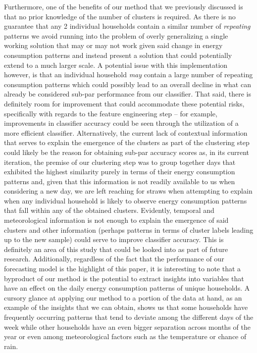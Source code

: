 \noindent \newline Furthermore, one of the benefits of our method that we previously discussed is that no prior knowledge of the number of clusters is required. As there is no guarantee that any 2 individual households contain a similar number of \textit{repeating} patterns we avoid running into the problem of overly generalizing a single working solution that may or may not work given said change in energy consumption patterns and instead present a solution that could potentially extend to a much larger scale. A potential issue with this implementation however, is that an individual household \textit{may} contain a large number of repeating consumption patterns which could possibly lead to an overall decline in what can already be considered sub-par performance from our classifier. That said, there is definitely room for improvement that could accommodate these potential risks, specifically with regards to the feature engineering step -- for example, improvements in classifier accuracy could be seen through the utilization of a more efficient classifier. Alternatively, the current lack of contextual information that serves to explain the emergence of the clusters as part of the clustering step could likely be the reason for obtaining sub-par accuracy scores as, in its current iteration, the premise of our clustering step was to group together days that exhibited the highest similarity purely in terms of their energy consumption patterns and, given that this information is not readily available to us when considering a new day, we are left reaching for straws when attempting to explain when any individual household is likely to observe energy consumption patterns that fall within any of the obtained clusters. Evidently, temporal and meteorological information is not enough to explain the emergence of said clusters and other information (perhaps patterns in terms of cluster labels leading up to the new sample) could serve to improve classifier accuracy. This is definitely an area of this study that could be looked into as part of future research. Additionally, regardless of the fact that the performance of our forecasting model is the highlight of this paper, it is interesting to note that a byproduct of our method is the potential to extract insights into variables that have an effect on the daily energy consumption patterns of unique households. A cursory glance at applying our method to a portion of the data at hand, as an example of the insights that we can obtain, shows us that some households have frequently occurring patterns that tend to deviate among the different days of the week while other households have an even bigger separation across months of the year or even among meteorological factors such as the temperature or chance of rain.


